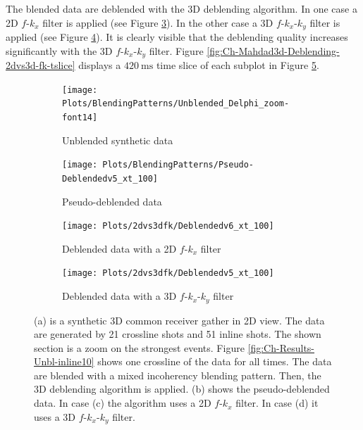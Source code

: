 The blended data are deblended with the 3D deblending algorithm. In one case a 2D $f$-$k_x$ filter is applied (see Figure \ref{fig:Ch-Mahdad3d-Deblending-2dfk}). In the other case a 3D $f$-$k_x$-$k_y$ filter is applied (see Figure \ref{fig:Ch-Mahdad3d-Deblending-3dfk}). It is clearly visible that the deblending quality increases significantly with the 3D $f$-$k_x$-$k_y$ filter. Figure \ref{fig:Ch-Mahdad3d-Deblending-2dvs3d-fk-tslice} displays a $\SI{420}{\milli\second}$ time slice of each subplot in Figure \ref{fig:Ch-Mahdad3d-Deblending-2dvs3d-fk}.
 
\begin{figure}
	
	\centering
	\begin{subfigure}[t]{0.8\textwidth}
		\centering
		\texttt{[image: Plots/BlendingPatterns/Unblended\_Delphi\_zoom-font14]}
		\caption{Unblended synthetic data}
		\label{fig:Ch-Mahdad3d-Unbl-Delphi}
	\end{subfigure}

	\par\bigskip
	
	\centering
	\begin{subfigure}[t]{0.8\textwidth}
		\texttt{[image: Plots/BlendingPatterns/Pseudo-Deblendedv5\_xt\_100]}
		\caption{Pseudo-deblended data}
		\label{fig:Ch-Mahdad3d-Deblending-Pseudo-Zoom}
	\end{subfigure}
	
	\par\bigskip

	\centering
	\begin{subfigure}[t]{0.8\textwidth}
		\texttt{[image: Plots/2dvs3dfk/Deblendedv6\_xt\_100]}
		\caption{Deblended data with a 2D $f$-$k_x$ filter}
		\label{fig:Ch-Mahdad3d-Deblending-2dfk}
	\end{subfigure}
	
	\par\bigskip
	
	\centering
	\begin{subfigure}[t]{0.8\textwidth}
		\texttt{[image: Plots/2dvs3dfk/Deblendedv5\_xt\_100]}
		\caption{Deblended data with a 3D $f$-$k_x$-$k_y$ filter}
		\label{fig:Ch-Mahdad3d-Deblending-3dfk}
	\end{subfigure}
	
	\caption{(a) is a synthetic 3D common receiver gather in 2D view. The data are generated by 21 crossline shots and 51 inline shots. The shown section is a zoom on the strongest events. Figure \ref{fig:Ch-Results-Unbl-inline10} shows one crossline of the data for all times. The data are blended with a mixed incoherency blending pattern. Then, the 3D deblending algorithm is applied. (b) shows the pseudo-deblended data. In case (c) the algorithm uses a 2D $f$-$k_x$ filter. In case (d) it uses a 3D $f$-$k_x$-$k_y$ filter.}
	\label{fig:Ch-Mahdad3d-Deblending-2dvs3d-fk}
	
\end{figure}


